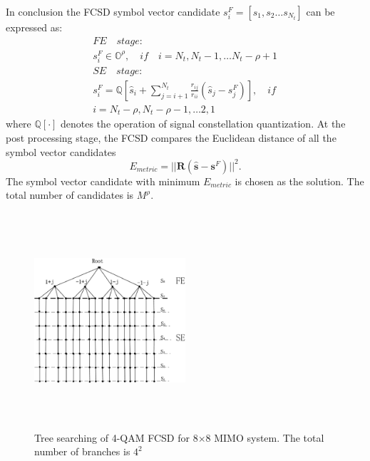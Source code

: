 \documentclass[letterpaper, 10pt, conference, twoside]{ieeeconf}
\begin{document}
In conclusion the FCSD symbol vector candidate $s^{F}_{i}=[s_{1},s_{2}\dots s_{N_{t}}]$ can be expressed as:
\begin{equation}
\begin{split}
&FE \quad stage:\\
&{s}_{i}^{F}\in    \mathbb{O}^{\rho},  \quad if\quad i=N_{t},N_{t}-1,\dots N_{t}-\rho+1\\
& SE\quad stage:\\
&{s}_{i}^{F}=\mathbb{Q}[\hat{s}_{i}+\sum_{j=i+1}^{N_{t}}\frac{r_{ij}}{r_{ii}}(\hat{s}_{j}-s_{j}^{F})], \quad if\quad \\
& i = N_{t}-\rho,N_{t}-\rho-1,\dots 2,1 
  \label{FCSD solution}
\end{split}
\end{equation}
where $\mathbb{Q}[\cdot]$ denotes the operation of signal constellation quantization. At the post processing stage, the FCSD compares the Euclidean distance of all the symbol vector candidates
\begin{equation}
E_{metric}=||\mathbf{R}(\mathbf{\hat{s}}-\mathbf{s}^{F})||^{2}.
\end{equation} 
The symbol vector candidate with minimum $E_{metric}$ is chosen as the solution. The total number of candidates is $M^{\rho}$.  
\begin{figure}[htb]
\centering
\includegraphics[width=0.5\textwidth, height=8cm]{FCSD_tree_searching.eps}
\caption{Tree searching of 4-QAM FCSD for 8$\times$8 MIMO system. The total number of branches is $4^{2}$}
\label{figure4}
\end{figure}
\end{document}

